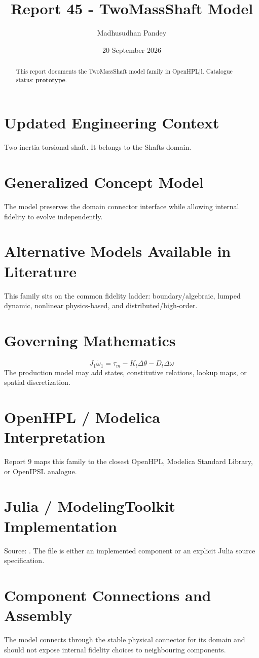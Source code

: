 \documentclass[10pt,a4paper]{article}
\title{Report 45 - TwoMassShaft Model}
\author{Madhusudhan Pandey}
\date{20 September 2026}
\begin{document}
\maketitle
\begin{abstract}This report documents the TwoMassShaft model family in OpenHPLjl. Catalogue status: \textbf{prototype}.\end{abstract}
\section{Updated Engineering Context}Two-inertia torsional shaft. It belongs to the Shafts domain.
\section{Generalized Concept Model}The model preserves the domain connector interface while allowing internal fidelity to evolve independently.
\section{Alternative Models Available in Literature}This family sits on the common fidelity ladder: boundary/algebraic, lumped dynamic, nonlinear physics-based, and distributed/high-order.
\section{Governing Mathematics}\[J_1\dot\omega_1=\tau_m-K_t\Delta\theta-D_t\Delta\omega\]The production model may add states, constitutive relations, lookup maps, or spatial discretization.
\section{OpenHPL / Modelica Interpretation}Report 9 maps this family to the closest OpenHPL, Modelica Standard Library, or OpenIPSL analogue.
\section{Julia / ModelingToolkit Implementation}Source: \texttt{}. The file is either an implemented component or an explicit Julia source specification.
\section{Component Connections and Assembly}The model connects through the stable physical connector for its domain and should not expose internal fidelity choices to neighbouring components.
\end{document}
